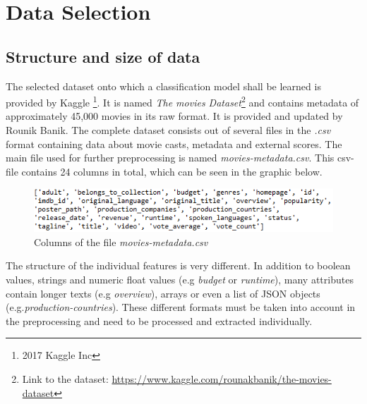\chapter{Data Selection}
\label{cha:data_selection}

\section{Structure and size of data}
The selected dataset onto which a classification model shall be learned is provided by Kaggle \footnote{2017 Kaggle Inc}. It is named \textit{The movies Dataset}\footnote{Link to the dataset: \hyperref[https://www.kaggle.com/rounakbanik/the-movies-dataset]{https://www.kaggle.com/rounakbanik/the-movies-dataset}} and contains metadata of approximately 45,000 movies in its raw format. It is provided and updated by Rounik Banik. The complete dataset consists out of several files in the \textit{.csv} format containing data about movie casts, metadata and external scores. The main file used for further preprocessing is named \textit{movies-metadata.csv}. This csv-file contains 24 columns in total, which can be seen in the graphic below.
\begin{figure}[ht]
	\centering
		\includegraphics[width=\textwidth]{images/Raw_dataset_headers.png}
	\caption{Columns of the file \textit{movies-metadata.csv}}
\end{figure}


The structure of the individual features is very different. In addition to boolean values, strings and numeric float values (e.g \textit{budget} or \textit{runtime}), many attributes contain longer texts (e.g \textit{overview}), arrays or even a list of JSON objects (e.g.\textit{production-countries}). These different formats must be taken into account in the preprocessing and need to be processed and extracted individually.


